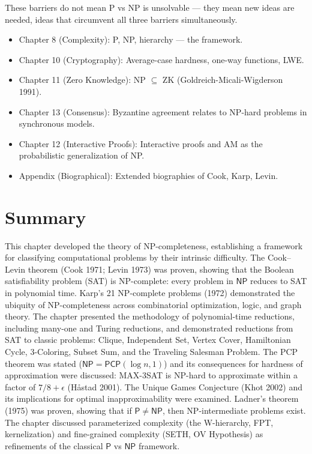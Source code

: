 These barriers do not mean P vs NP is unsolvable — they mean new ideas are needed, ideas that circumvent all three barriers simultaneously.

\begin{itemize}
\item Chapter 8 (Complexity): P, NP, hierarchy — the framework.
\item Chapter 10 (Cryptography): Average-case hardness, one-way functions, LWE.
\item Chapter 11 (Zero Knowledge): NP $\subseteq$ ZK (Goldreich-Micali-Wigderson 1991).
\item Chapter 13 (Consensus): Byzantine agreement relates to NP-hard problems in synchronous models.
\item Chapter 12 (Interactive Proofs): Interactive proofs and AM as the probabilistic generalization of NP.
\item Appendix (Biographical): Extended biographies of Cook, Karp, Levin.
\end{itemize}

\section{Summary}
\label{sec:np:summary}

This chapter developed the theory of NP-completeness, establishing a framework for classifying computational problems by their intrinsic difficulty. The Cook--Levin theorem (Cook 1971; Levin 1973) was proven, showing that the Boolean satisfiability problem (SAT) is NP-complete: every problem in $\mathsf{NP}$ reduces to SAT in polynomial time. Karp's 21 NP-complete problems (1972) demonstrated the ubiquity of NP-completeness across combinatorial optimization, logic, and graph theory. The chapter presented the methodology of polynomial-time reductions, including many-one and Turing reductions, and demonstrated reductions from SAT to classic problems: Clique, Independent Set, Vertex Cover, Hamiltonian Cycle, 3-Coloring, Subset Sum, and the Traveling Salesman Problem. The PCP theorem was stated ($\mathsf{NP} = \mathsf{PCP}(\log n, 1)$) and its consequences for hardness of approximation were discussed: MAX-3SAT is NP-hard to approximate within a factor of $7/8 + \epsilon$ (Håstad 2001). The Unique Games Conjecture (Khot 2002) and its implications for optimal inapproximability were examined. Ladner's theorem (1975) was proven, showing that if $\mathsf{P} \neq \mathsf{NP}$, then NP-intermediate problems exist. The chapter discussed parameterized complexity (the W-hierarchy, FPT, kernelization) and fine-grained complexity (SETH, OV Hypothesis) as refinements of the classical $\mathsf{P}$ vs $\mathsf{NP}$ framework.

